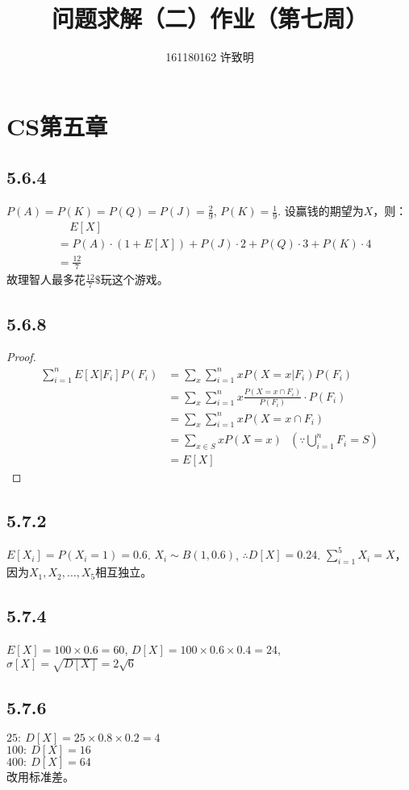 \documentclass[twocolumn]{article}
\begin{document}
	\title{问题求解（二）作业（第七周）}\author{161180162 许致明}\maketitle
	\section*{CS第五章}
	\subsection*{5.6.4}
	$P(A)=P(K)=P(Q)=P(J)=\frac{2}{9}$, $P(K)=\frac{1}{9}$. 设赢钱的期望为$X$，则：
	\[
		\begin{aligned}
			&\ \ \ \ \ E[X]\\
			&=P(A)\cdot\left(1+E[X]\right)+P(J)\cdot 2+P(Q)\cdot 3+P(K)\cdot 4\\
			&=\frac{12}{7}
		\end{aligned}
	\]
	故理智人最多花$\frac{12}{7}\$$玩这个游戏。
	\subsection*{5.6.8}
	\begin{proof}
		\[
		\begin{aligned}
			\sum_{i=1}^{n}E[X|F_i]P(F_i)&=\sum_x\sum_{i=1}^{n}xP(X=x|F_i)P(F_i)\\
			&=\sum_x\sum_{i=1}^{n}x\frac{P(X=x\cap F_i)}{P(F_i)}\cdot P(F_i)\\
			&=\sum_x\sum_{i=1}^{n}xP(X=x\cap F_i)\\
			&=\sum_{x\in S}xP(X=x)\ \ \ (\because \bigcup_{i=1}^{n}F_i=S)\\
			&=E[X]
		\end{aligned}
		\]
	\end{proof}
	\subsection*{5.7.2}%
	$E[X_i]=P(X_i=1)=0.6$. $X_i\sim B(1,0.6)$, $\therefore D[X]=0.24$. $\sum_{i=1}^{5}X_i=X$，因为$X_1,X_2,\dots,X_5$相互独立。
	\subsection*{5.7.4}
	$E[X]=100\times 0.6=60$, $D[X]=100\times 0.6\times 0.4=24$, $\sigma[X]=\sqrt{D[X]}=2\sqrt{6}$
	\subsection*{5.7.6}
	$25:\ D[X]=25\times 0.8\times 0.2=4$\\
	$100:\ D[X]=16$\\
	$400:\ D[X]=64$\\
	改用标准差。
\end{document}
